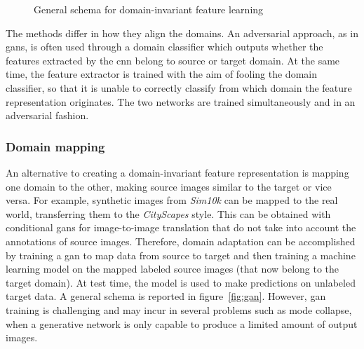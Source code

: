 \documentclass[%
    corpo=12pt,
    twoside,
    stile=classica,   
    tipotesi=magistrale,
    evenboxes,
    english,
	numerazioneromana,
]{toptesi}
\begin{document}
\begin{figure}[ht]
	\centering
	\caption{General schema for domain-invariant feature learning\cite{wilson2020survey}}
	\label{fig:align}
\end{figure}

The methods differ in how they align the domains. An adversarial approach, as in \glspl{gan}, is often used through a domain classifier which outputs whether the features extracted by the \gls{cnn} belong to source or target domain. At the same time, the feature extractor is trained with the aim of fooling the domain classifier, so that it is unable to correctly classify from which domain the feature representation originates. The two networks are trained simultaneously and in an adversarial fashion.

\subsubsection{Domain mapping}
An alternative to creating a domain-invariant feature representation is mapping one domain to the other, making source images similar to the target or vice versa. For example, synthetic images from \textit{Sim10k} can be mapped to the real world, transferring them to the \textit{CityScapes} style. This can be obtained with conditional \glspl{gan} for image-to-image translation that do not take into account the annotations of source images. Therefore, domain adaptation can be accomplished by training a \gls{gan} to map data from source to target and then training a machine learning model on the mapped labeled source images (that now belong to the target domain). At test time, the model is used to make predictions on unlabeled target data. A general schema is reported in figure~\ref{fig:gan}. However, \gls{gan} training is challenging and may incur in several problems such as mode collapse, when a generative network is only capable to produce a limited amount of output images.
\end{document}
